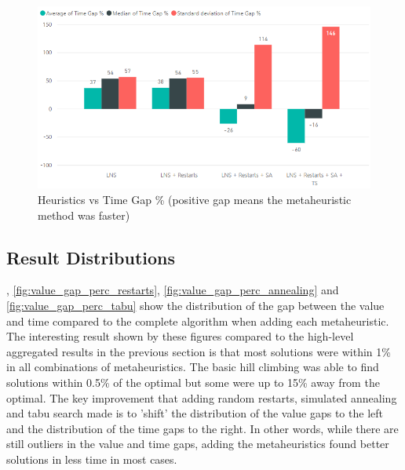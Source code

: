 \begin{figure}[h!]
    \centering
    \includegraphics[width=\textwidth]{Figures/Metaheuristics/time_gap_perc_vs_heuristic.png}
    \caption{Heuristics vs Time Gap \% (positive gap means the metaheuristic method was faster)}
    \label{fig:time_gap_perc_vs_heuristic}
\end{figure}


\subsection{Result Distributions}
\label{subsec:result_distributions}

, \cref{fig:value_gap_perc_restarts}, \cref{fig:value_gap_perc_annealing} and \cref{fig:value_gap_perc_tabu} show the distribution of the gap between the value and time compared to the complete algorithm when adding each metaheuristic. The interesting result shown by these figures compared to the high-level aggregated results in the previous section is that most solutions were within 1\% in all combinations of metaheuristics. The basic hill climbing was able to find solutions within 0.5\% of the optimal but some were up to 15\% away from the optimal. The key improvement that adding random restarts, simulated annealing and tabu search made is to 'shift' the distribution of the value gaps to the left and the distribution of the time gaps to the right. In other words, while there are still outliers in the value and time gaps, adding the metaheuristics found better solutions in less time in most cases.

